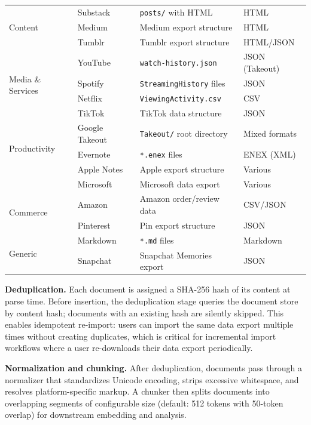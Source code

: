 \documentclass[manuscript,review]{acmart}
\begin{document}
\begin{table}[t]
\begin{tabular}{llll}
\multirow{3}{*}{Content}
  & Substack       & \texttt{posts/} with HTML          & HTML \\
  & Medium         & Medium export structure             & HTML \\
  & Tumblr         & Tumblr export structure             & HTML/JSON \\
\midrule
\multirow{4}{*}{Media \& Services}
  & YouTube        & \texttt{watch-history.json}        & JSON (Takeout) \\
  & Spotify        & \texttt{StreamingHistory} files     & JSON \\
  & Netflix        & \texttt{ViewingActivity.csv}       & CSV \\
  & TikTok         & TikTok data structure               & JSON \\
\midrule
\multirow{3}{*}{Productivity}
  & Google Takeout & \texttt{Takeout/} root directory    & Mixed formats \\
  & Evernote       & \texttt{*.enex} files               & ENEX (XML) \\
  & Apple Notes    & Apple export structure              & Various \\
  & Microsoft      & Microsoft data export               & Various \\
\midrule
\multirow{2}{*}{Commerce}
  & Amazon         & Amazon order/review data            & CSV/JSON \\
  & Pinterest      & Pin export structure                & JSON \\
\midrule
\multirow{2}{*}{Generic}
  & Markdown       & \texttt{*.md} files                 & Markdown \\
  & Snapchat       & Snapchat Memories export            & JSON \\
\bottomrule
\end{tabular}
\end{table}

\textbf{Deduplication.}
Each document is assigned a SHA-256 hash of its content at parse time.
Before insertion, the deduplication stage queries the document store by content hash; documents with an existing hash are silently skipped.
This enables idempotent re-import: users can import the same data export multiple times without creating duplicates, which is critical for incremental import workflows where a user re-downloads their data export periodically.

\textbf{Normalization and chunking.}
After deduplication, documents pass through a normalizer that standardizes Unicode encoding, strips excessive whitespace, and resolves platform-specific markup.
A chunker then splits documents into overlapping segments of configurable size (default: 512 tokens with 50-token overlap) for downstream embedding and analysis.
\end{document}
